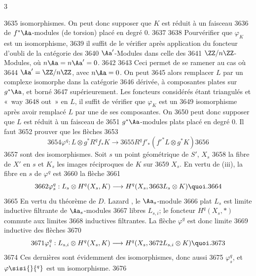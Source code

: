 3	\documentclass[10pt]{../fichiers-configuration-latex/smfart}
\begin{document}
  3635	isomorphismes. On peut donc supposer que $K$ est réduit à un faisceau
  3636	de $f^{\ast}\Aa$-modules (de torsion) placé en degré $0$.
  3637	
  3638	Pour\pageoriginale vérifier que $\varphi_{K}$ est un isomorphisme,
  3639	il suffit de le vérifier après application du foncteur d'oubli de la catégorie des
  3640	$\Aa'$-Modules dans celle des
  3641	$\ZZ/n\ZZ$-Modules, où $n\Aa=n\Aa'=0$.
  3642	
  3643	Ceci permet de se ramener au cas où
  3644	$\Aa'=\ZZ/n\ZZ$, avec $n\Aa=0$. On peut
  3645	alors remplacer $L$ par un complexe isomorphe dans la catégorie
  3646	dérivée, à composantes plates sur $g^{\ast}\Aa$, et borné
  3647	supérieurement. Les foncteurs considérés étant triangulés et « way
  3648	out »  en $L$, il suffit de vérifier que $\varphi_{K}$ est un
  3649	isomorphisme après avoir remplacé $L$ par une de ses composantes. On
  3650	peut donc supposer que $L$ est réduit à un faisceau de
  3651	$g^{\ast}\Aa$-modules plats placé en degré $0$. Il faut
  3652	prouver que les flèches
  3653	\[
  3654	\varphi^{q}:L\otimes g^{\ast}R^{q}f_{\ast}K\longrightarrow
  3655	R^{q}f'_{\ast}({f'}^{\ast}L\otimes g^{\ast}K)
  3656	\]
  3657	sont des isomorphismes. Soit $s$ un point géométrique de $S'$, $X_s$
  3658	la fibre de $X'$ en $s$ et $K_s$ les images réciproques de $K$ sur
  3659	$X_s$. En vertu de  (iii), la fibre en $s$ de $\varphi^{q}$ est
  3660	la flèche
  3661	\[
  3662	\varphi^{q}_s:L_{s}\otimes H^{q}(X_s,K)\longrightarrow H^{q}(X_s,
  3663	L_s\otimes K){\quoi}.
  3664	\]
  3665	En vertu du théorème de $D$. Lazard \cite{La}, le $\Aa_s$-module
  3666	plat $L_s$ est limite inductive filtrante de $\Aa_s$-modules
  3667	libres $L_{s,i}$; le foncteur $H^{q}(X_s,\ast)$ commute aux limites
  3668	inductives filtrantes. La flèche $\varphi^{q}$ est donc limite
  3669	inductive des flèches
  3670	\[
  3671	\varphi^{q}_i:L_{s,i}\otimes H^{q}(X_s,K)\longrightarrow H^{q}(X_s,
  3672	L_{s,i}\otimes K){\quoi}.
  3673	\]
  3674	Ces dernières sont évidemment des isomorphismes, donc aussi
  3675	$\varphi^{q}_s$, et $\varphi\sisi{}{^q}$ est un isomorphisme.
  3676	
\end{document}
